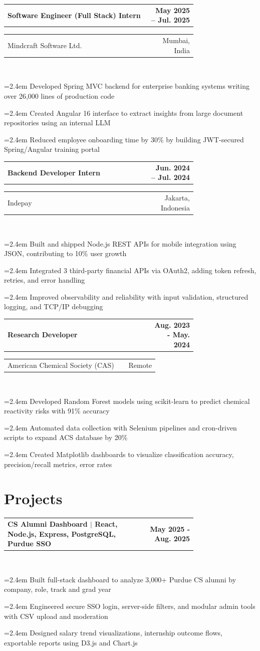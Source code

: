 \documentclass[letterpaper,11pt]{article}
\makeatletter
\newcommand{\LeftRight}[2]{%
  \begin{tabular*}{\linewidth}{@{\extracolsep{\fill}} p{0.75\linewidth} r}
    #1 & #2 \\
  \end{tabular*}
}
\newcommand{\Bitem}[1]{%
  \par\hangindent=2.4em\hangafter=1
  \noindent\hspace{1em}%
  \makebox[1.4em][l]{\raisebox{0.2ex}{\scriptsize$\bullet$}}#1\\[-2pt]%
}
\makeatother
\begin{document}
      \vspace{7pt}  

      \LeftRight{\textbf{Software Engineer (Full Stack) Intern}}{\textbf{May 2025 -- Jul. 2025}}
      \LeftRight{Mindcraft Software Ltd.}{Mumbai, India} \\
        \Bitem{Developed Spring MVC backend for enterprise banking systems writing over 26,000 lines of production code}
        \Bitem{Created Angular 16 interface to extract insights from large document repositories using an internal LLM}
        \Bitem{Reduced employee onboarding time by 30\% by building JWT-secured Spring/Angular training portal}

        \vspace{7pt}  

      \LeftRight{\textbf{Backend Developer Intern}}{\textbf{Jun. 2024 -- Jul. 2024}}
      \LeftRight{Indepay}{Jakarta, Indonesia} \\
        \Bitem{Built and shipped Node.js REST APIs for mobile integration using JSON, contributing to 10\% user growth}
        \Bitem{Integrated 3 third-party financial APIs via OAuth2, adding token refresh, retries, and error handling}
        \Bitem{Improved observability and reliability with input validation, structured logging, and TCP/IP debugging}

      \vspace{7pt}  

      \LeftRight{\textbf{Research Developer}}{\textbf{Aug. 2023 - May. 2024}}
      \LeftRight{American Chemical Society (CAS)}{Remote} \\
        \Bitem{Developed Random Forest models using scikit-learn to predict chemical reactivity risks with 91\% accuracy}
        \Bitem{Automated data collection with Selenium pipelines and cron-driven scripts to expand ACS database by 20\%}
        \Bitem{Created Matplotlib dashboards to visualize classification accuracy, precision/recall metrics, error rates}  


\section{Projects}
    \LeftRight{\textbf{CS Alumni Dashboard $|$ React, Node.js, Express, PostgreSQL, Purdue SSO}}{\textbf{May 2025 - Aug. 2025}} \\
\Bitem{Built full-stack dashboard to analyze 3,000+ Purdue CS alumni by company, role, track and grad year}
\Bitem{Engineered secure SSO login, server-side filters, and modular admin tools with CSV upload and moderation}
\Bitem{Designed salary trend visualizations, internship outcome flows, exportable reports using D3.js and Chart.js}
\end{document}
